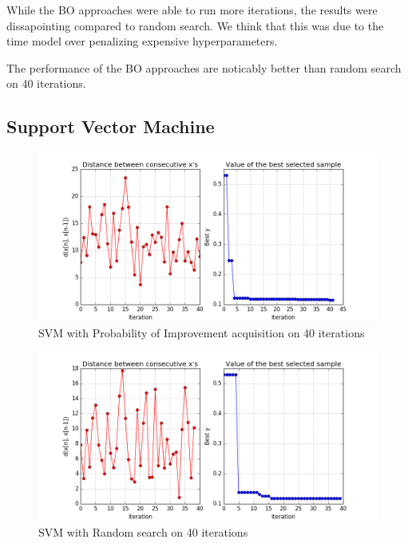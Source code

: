 \documentclass[letterpaper]{article}
\begin{document}
While the BO approaches were able to run more iterations, the results were dissapointing compared to random search.
We think that this was due to the time model over penalizing expensive hyperparameters.

The performance of the BO approaches are noticably better than random search on 40 iterations.

\subsection {Support Vector Machine}
\begin{figure}[h]
	\includegraphics[width=\linewidth]{EIX_SVM_X_init2_NC_ITER40.png}
	\caption{SVM with Probability of Improvement acquisition on 40 iterations}
\end{figure}
\begin{figure}[h]
	\includegraphics[width=\linewidth]{RAND_SVM_X_init2_NC_ITER40.png}
	\caption{SVM with Random search on 40 iterations}
\end{figure}
\end{document}
